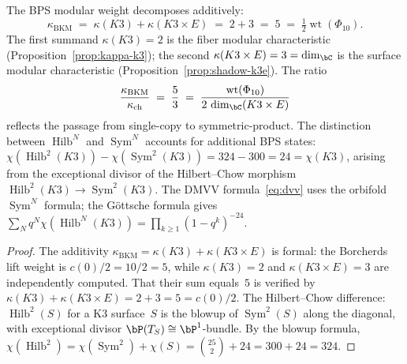 \begin{proposition}
\label{prop:kappa-bps-decomposition}
The BPS modular weight decomposes additively:
\begin{equation}\label{eq:kappa-bps-decomposition}
\kappa_{\mathrm{BKM}}
\;=\; \kappa(K3) + \kappa(K3 \times E)
\;=\; 2 + 3 \;=\; 5
\;=\; \tfrac{1}{2}\operatorname{wt}(\Phi_{10}).
\end{equation}
The first summand $\kappa(K3) = 2$ is the fiber modular
characteristic \textup{(}Proposition~\textup{\ref{prop:kappa-k3})};
the second $\kappa(K3 \times E) = 3 = \dim_\bC$ is the
surface modular characteristic
\textup{(}Proposition~\textup{\ref{prop:shadow-k3e})}.
The ratio
\[
\frac{\kappa_{\mathrm{BKM}}}{\kappa_{\mathrm{ch}}}
\;=\; \frac{5}{3}
\;=\; \frac{\operatorname{wt}(\Phi_{10})}{2\,\dim_\bC(K3 \times E)}
\]
reflects the passage from single-copy to symmetric-product.
The distinction between $\operatorname{Hilb}^N$ and
$\operatorname{Sym}^N$ accounts for additional BPS states:
$\chi(\operatorname{Hilb}^2(K3)) - \chi(\operatorname{Sym}^2(K3))
= 324 - 300 = 24 = \chi(K3)$, arising from the exceptional
divisor of the Hilbert--Chow morphism
$\operatorname{Hilb}^2(K3) \to \operatorname{Sym}^2(K3)$.
The DMVV formula~\eqref{eq:dvv} uses the orbifold
$\operatorname{Sym}^N$ formula; the G\"ottsche formula gives
$\sum_N q^N \chi(\operatorname{Hilb}^N(K3))
= \prod_{k \geq 1}(1-q^k)^{-24}$.
\end{proposition}

\begin{proof}
The additivity $\kappa_{\mathrm{BKM}} = \kappa(K3) +
\kappa(K3 \times E)$ is formal: the Borcherds lift weight is
$c(0)/2 = 10/2 = 5$, while $\kappa(K3) = 2$ and
$\kappa(K3 \times E) = 3$ are independently computed.
That their sum equals~$5$ is verified by
$\kappa(K3) + \kappa(K3 \times E) = 2 + 3 = 5 = c(0)/2$.
The Hilbert--Chow difference: $\operatorname{Hilb}^2(S)$
for a K3 surface~$S$ is the blowup of $\operatorname{Sym}^2(S)$
along the diagonal, with exceptional divisor
$\bP(T_S) \cong \bP^1$-bundle. By the blowup formula,
$\chi(\operatorname{Hilb}^2) = \chi(\operatorname{Sym}^2)
+ \chi(S) = \binom{25}{2} + 24 = 300 + 24 = 324$.
\end{proof}

